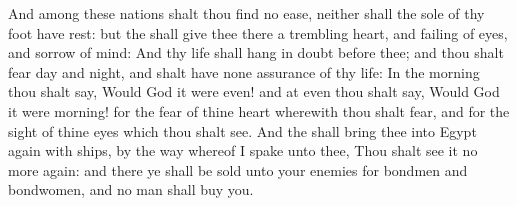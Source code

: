\begin{biblechapter}
\verse And among these nations shalt thou find no ease, neither shall the sole of thy foot have rest: but the \LORD shall give thee there a trembling heart, and failing of eyes, and sorrow of mind:
\verse And thy life shall hang in doubt before thee; and thou shalt fear day and night, and shalt have none assurance of thy life:
\verse In the morning thou shalt say, Would God it were even! and at even thou shalt say, Would God it were morning! for the fear of thine heart wherewith thou shalt fear, and for the sight of thine eyes which thou shalt see.
\verse And the \LORD shall bring thee into Egypt again with ships, by the way whereof I spake unto thee, Thou shalt see it no more again: and there ye shall be sold unto your enemies for bondmen and bondwomen, and no man shall buy you.
\end{biblechapter}

